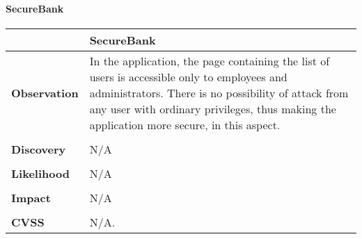 \paragraph{SecureBank} \mbox{}
\begin{longtable*}{p{.20\textwidth} | p{.80\textwidth}}
    \hline
    & \textbf{SecureBank} \\
    \hline
    \textbf{Observation} &
       In the application, the page containing the list of users is accessible only to employees and administrators. There is no possibility of attack from any user with ordinary privileges, thus making the application more secure, in this aspect.
    \\\\
    \textbf{Discovery} &
   		N/A
    \\\\
    \textbf{Likelihood} &
	   N/A
    \\\\
    \textbf{Impact} &
  		N/A
    \\\\
    \textbf{CVSS} &
       N/A.
    \\
    \hline
\end{longtable*}
\clearpage